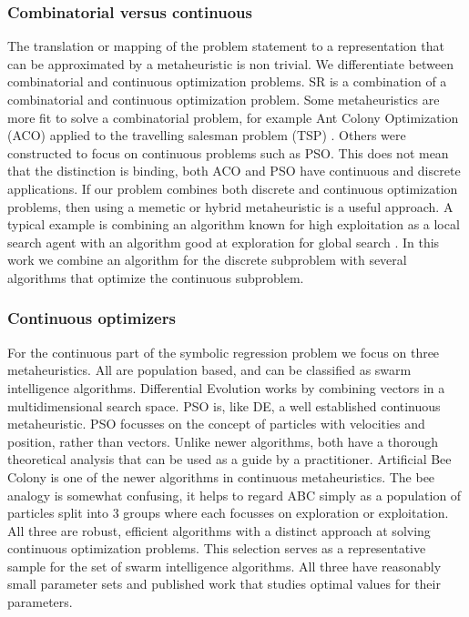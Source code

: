 \subsubsection{Combinatorial versus continuous}
The translation or mapping of the problem statement to a representation that can be approximated by a metaheuristic is non trivial.
We differentiate between combinatorial and continuous optimization problems. SR is a combination of a combinatorial and continuous optimization problem. Some metaheuristics are more fit to solve a combinatorial problem, for example Ant Colony Optimization (ACO) applied to the travelling salesman problem (TSP) \cite{ACO}. Others were constructed to focus on continuous problems such as PSO. This does not mean that the distinction is binding, both ACO and PSO have continuous and discrete applications. If our problem combines both  discrete and continuous optimization problems, then using a memetic or hybrid metaheuristic is a useful approach. A typical example is combining an algorithm known for high exploitation as a local search agent with an algorithm good at exploration for global search \cite{ABCPSO}.
In this work we combine an algorithm for the discrete subproblem with several algorithms that optimize the continuous subproblem. 

\subsubsection{Continuous optimizers}
For the continuous part of the symbolic regression problem we focus on three metaheuristics. All are population based, and can be classified as swarm intelligence algorithms. Differential Evolution \cite{DE} works by combining vectors in a multidimensional search space. PSO is, like DE, a well established continuous metaheuristic. PSO focusses on the concept of particles with velocities and position, rather than vectors. Unlike newer algorithms, both have a thorough theoretical analysis that can be used as a guide by a practitioner. Artificial Bee Colony \cite{ABC} is one of the newer algorithms in continuous metaheuristics. The bee analogy is somewhat confusing, it helps to regard ABC simply as a population of particles split into 3 groups where each focusses on exploration or exploitation. All three are robust, efficient algorithms with a distinct approach at solving continuous optimization problems. This selection serves as a representative sample for the set of swarm intelligence algorithms. All three have reasonably small parameter sets and published work that studies optimal values for their parameters.


